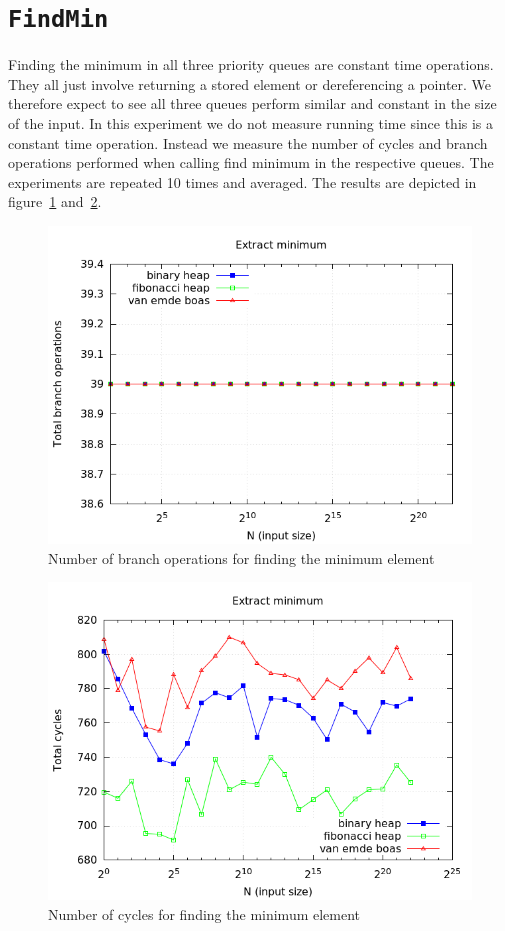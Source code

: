 \documentclass[a4paper,oneside,article,11pt]{memoir}
\begin{document}
\section{\texttt{FindMin}}
Finding the minimum in all three priority queues are constant time operations. They all just involve returning a stored element or dereferencing a pointer. We therefore expect to see all three queues perform similar and constant in the size of the input. In this experiment we do not measure running time since this is a constant time operation. Instead we measure the number of cycles and branch operations performed when calling find minimum in the respective queues. The experiments are repeated 10 times and averaged. The results are depicted in figure~\ref{fig:findmin_br} and~\ref{fig:findmin_cyc}.

\begin{figure}[H]
\centering
\includegraphics[scale=0.5]{../res2/findmin/extract_min_branch.png}
\caption{Number of branch operations for finding the minimum element}
\label{fig:findmin_br}
\end{figure}

\begin{figure}[H]
\centering
\includegraphics[scale=0.5]{../res2/findmin/extract_min_cycles.png}
\caption{Number of cycles for finding the minimum element}
\label{fig:findmin_cyc}
\end{figure}
\end{document}
